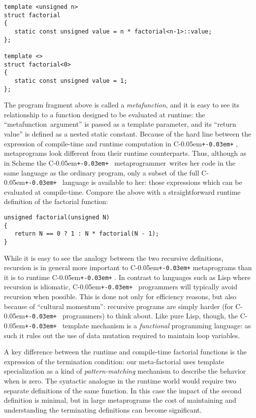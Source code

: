 \documentclass{kapproc}
\newcommand{\Cpp}{C\kern-0.05em\texttt{+\kern-0.03em+}%
}
\newcommand{\mpgmer}{meta\-pro\-gram\-mer}
\newcommand{\mfn}{meta\-func\-tion}
\begin{document}
{\small
\begin{codesamp}\begin{verbatim}
template <unsigned n>
struct factorial
{
   static const unsigned value = n * factorial<n-1>::value;
};

template <>
struct factorial<0>
{
   static const unsigned value = 1;
};
\end{verbatim}
\end{codesamp}
}

The program fragment above is called a \emph{\mfn}, and it is easy to
see its relationship to a function designed to be evaluated at
runtime: the ``\mfn\ argument'' is passed as a template parameter, and
its ``return value'' is defined as a nested static constant.  Because
of the hard line between the expression of compile-time and runtime
computation in \Cpp, metaprograms look different from their runtime
counterparts. Thus, although as in Scheme the \Cpp\ \mpgmer\ writes
her code in the same language as the ordinary program, only a subset
of the full \Cpp\ language is available to her: those expressions
which can be evaluated at compile-time. Compare the above with a
straightforward runtime definition of the factorial function:

{\small
\begin{codesamp}\begin{verbatim}
unsigned factorial(unsigned N)
{
   return N == 0 ? 1 : N * factorial(N - 1);
}
\end{verbatim}
\end{codesamp}
}

While it is easy to see the analogy between the two recursive
definitions, recursion is in general more important to \Cpp{}
metaprograms than it is to runtime \Cpp. In contrast to languages such
as Lisp where recursion is idiomatic, \Cpp\ programmers will typically
avoid recursion when possible. This is done not only for efficiency
reasons, but also because of ``cultural momentum'': recursive programs
are simply harder (for \Cpp\ programmers) to think about. Like pure
Lisp, though, the \Cpp\ template mechanism is a \emph{functional}
programming language: as such it rules out the use of data mutation
required to maintain loop variables.

A key difference between the runtime and compile-time factorial
functions is the expression of the termination condition: our
meta-factorial uses template specialization as a kind of
\emph{pattern-matching} mechanism to describe the behavior when
 is zero. The syntactic analogue in the runtime world would
require two separate definitions of the same function. In this case
the impact of the second definition is minimal, but in large
metaprograms the cost of maintaining and understanding the terminating
definitions can become significant.
\end{document}
